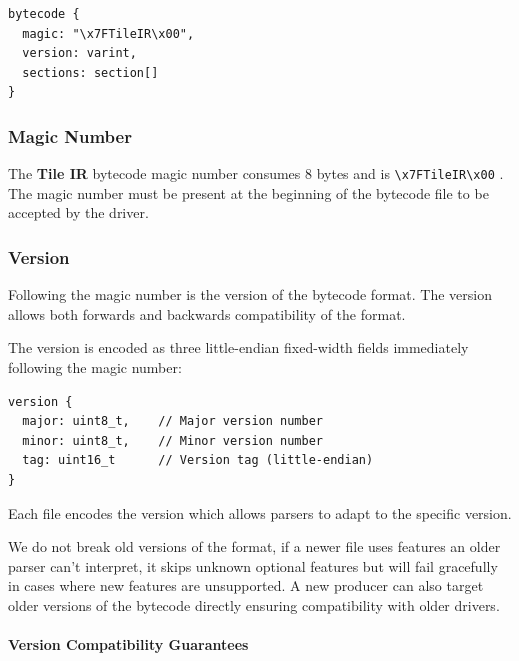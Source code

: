 \documentclass{article}
\begin{document}
\begin{lstlisting}
bytecode {
  magic: "\x7FTileIR\x00",
  version: varint,
  sections: section[]
}
\end{lstlisting}

\subsubsection{Magic Number}

The \textbf{Tile IR} bytecode magic number consumes 8 bytes and is \texttt{\textbackslash{}x7FTileIR\textbackslash{}x00} . The magic number must be present at the beginning of the bytecode file to be accepted by the driver.



\subsubsection{Version}

Following the magic number is the version of the bytecode format. The version allows both forwards and backwards compatibility of the format.


The version is encoded as three little-endian fixed-width fields immediately following the magic number:


\begin{lstlisting}
version {
  major: uint8_t,    // Major version number
  minor: uint8_t,    // Minor version number
  tag: uint16_t      // Version tag (little-endian)
}
\end{lstlisting}

Each file encodes the version which allows parsers to adapt to the specific version.

We do not break old versions of the format, if a newer file uses features an older parser can't interpret, it skips unknown optional features but will fail gracefully in cases where new features are unsupported. A new producer can also target older versions of the bytecode directly ensuring compatibility with older drivers.


\paragraph{Version Compatibility Guarantees}
\end{document}
